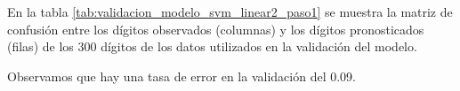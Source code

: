 \documentclass[12pt,spanish,a4paper]{article}
\numberwithin{equation}{section}
\begin{document}
En la tabla \ref{tab:validacion_modelo_svm_linear2_paso1} se muestra la
matriz de confusión entre los dígitos observados (columnas) y los
dígitos pronosticados (filas) de los 300 dígitos de los datos utilizados
en la validación del modelo.

\begin{table}[ht]
\centering
{}
\caption{Matriz de confusión entre los dígitos de validación y los dígitos pronosticados por el modelo.} 
\label{tab:validacion_modelo_svm_linear2_paso1}
\end{table}

Observamos que hay una tasa de error en la validación del 0.09.
\end{document}
